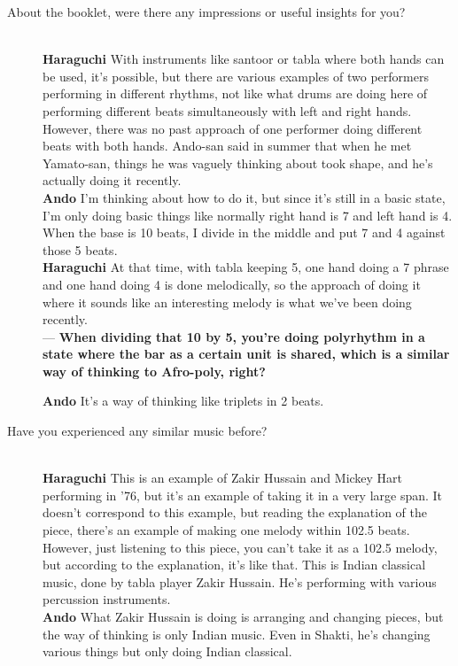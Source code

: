 \begin{description}
\item [About the booklet, were there any impressions or useful insights for you?]\mbox{}\\

{\bf Haraguchi} With instruments like santoor or tabla where both hands can be used, it's possible, but there are various examples of two performers performing in different rhythms, not like what drums are doing here of performing different beats simultaneously with left and right hands. However, there was no past approach of one performer doing different beats with both hands. Ando-san said in summer that when he met Yamato-san, things he was vaguely thinking about took shape, and he's actually doing it recently.\\

{\bf Ando} I'm thinking about how to do it, but since it's still in a basic state, I'm only doing basic things like normally right hand is 7 and left hand is 4. When the base is 10 beats, I divide in the middle and put 7 and 4 against those 5 beats.\\

{\bf Haraguchi} At that time, with tabla keeping 5, one hand doing a 7 phrase and one hand doing 4 is done melodically, so the approach of doing it where it sounds like an interesting melody is what we've been doing recently.\\

--- {\bf When dividing that 10 by 5, you're doing polyrhythm in a state where the bar as a certain unit is shared, which is a similar way of thinking to Afro-poly, right?}

{\bf Ando} It's a way of thinking like triplets in 2 beats.

\item [Have you experienced any similar music before?]\mbox{}\\

{\bf Haraguchi} This is an example of Zakir Hussain and Mickey Hart performing in '76, but it's an example of taking it in a very large span. It doesn't correspond to this example, but reading the explanation of the piece, there's an example of making one melody within 102.5 beats. However, just listening to this piece, you can't take it as a 102.5 melody, but according to the explanation, it's like that. This is Indian classical music, done by tabla player Zakir Hussain. He's performing with various percussion instruments.\\

{\bf Ando} What Zakir Hussain is doing is arranging and changing pieces, but the way of thinking is only Indian music. Even in Shakti, he's changing various things but only doing Indian classical.\\


\end{description}

